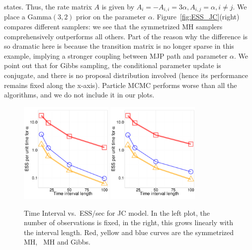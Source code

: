 {  states. Thus, the rate matrix $A$ is given by 
$A_i = -A_{i,i} = 3\alpha, A_{i, j} = \alpha,i \neq j.$
We place a Gamma$(3,2)$ prior on the parameter $\alpha$.
Figure~\ref{fig:ESS_JC}(right) compares different samplers: we see that the
symmetrized MH samplers comprehensively outperforms all others.
Part of the reason why the difference is so dramatic here is because the
transition matrix is no longer sparse in this example, implying a stronger
coupling between MJP path and parameter $\alpha$. We point out that for Gibbs
sampling, the conditional parameter update is conjugate, and there is no
proposal distribution involved (hence its performance remains fixed along
the x-axis). Particle MCMC performs worse
than all the algorithms, and we do not include it in our plots.
  \begin{figure}%
  \centering
  \begin{minipage}[!hp]{0.99\linewidth}
  \centering
    \includegraphics [width=0.40\textwidth, angle=0]{figs/ESS_vs_t_alpha_JC.pdf}
	\hspace{.5in}
  \centering 
    \includegraphics [width=0.40\textwidth, angle=0]{figs/ESS_vs_t_alpha_fixobservation_JC.pdf}
  \end{minipage}
    \caption{Time Interval vs.\ ESS/sec for JC model. In the left plot, the number of 
    observations is fixed, in the right, this grows linearly with the
  interval length. Red, yellow and blue curves are the symmetrized MH,
  \naive\ MH and Gibbs. }
	\label{fig:jc_model_vs_t}
  \end{figure}
  \begin{figure}[H]
  \centering


\end{figure}}
